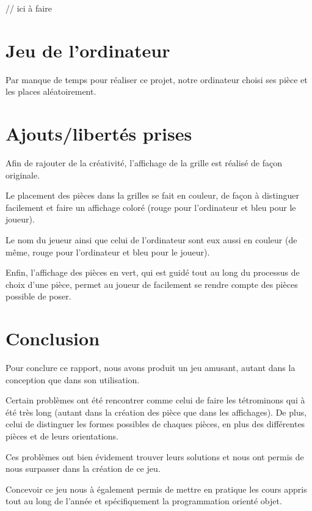 \documentclass[a4paper, titlepage, french]{report}
\begin{document}
\color{red}
// ici à faire
\color{black}


\chapter{Jeu de l'ordinateur}

Par manque de temps pour réaliser ce projet, notre ordinateur choisi ses pièce et les places aléatoirement.
\chapter{Ajouts/libertés prises}

Afin de rajouter de la créativité, l'affichage de la grille est réalisé de façon originale.
\bigskip

Le placement des pièces dans la grilles se fait en couleur, de façon à distinguer facilement et faire un affichage coloré (rouge pour l'ordinateur et bleu pour le joueur).
\bigskip

Le nom du jeueur ainsi que celui de l'ordinateur sont eux aussi en couleur (de même, rouge pour l'ordinateur et bleu pour le joueur).
\bigskip

Enfin, l'affichage des pièces en vert, qui est guidé tout au long du processus de choix d'une pièce, permet au joueur de facilement se rendre compte des pièces possible de poser.


\chapter{Conclusion}

Pour conclure ce rapport, nous avons produit un jeu amusant, autant dans la conception que dans son utilisation.
\bigskip

Certain problèmes ont été rencontrer comme celui de faire les tétrominons qui à été très long (autant dans la création des pièce que dans les affichages).
De plus, celui de distinguer les formes possibles de chaques pièces, en plus des différentes pièces et de leurs orientations.
\bigskip

Ces problèmes ont bien évidement trouver leurs solutions et nous ont permis de nous surpasser dans la création de ce jeu.
\bigskip

Concevoir ce jeu nous à également permis de mettre en pratique les cours appris tout au long de l'année et spécifiquement la programmation orienté objet.
\end{document}
